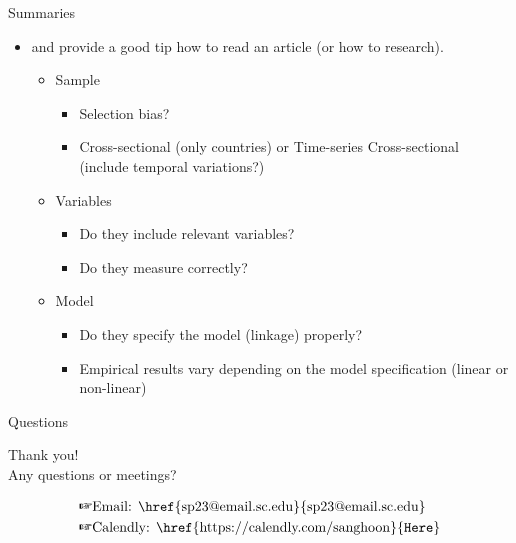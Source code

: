 \documentclass[xcolor=dvipsnames]{beamer}
\begin{document}
\begin{frame}[fragile]{Summaries}
	\begin{itemize}
    \item \citet{boix:stokes:2003} and \citet{wucherpfennig:Deutsch:2009} provide a good tip how to read an article (or how to research).
    \begin{itemize}
      \item Sample
        \begin{itemize}
          \item Selection bias?
          \item Cross-sectional (only countries) or Time-series Cross-sectional (include temporal variations?)
        \end{itemize}
      \item Variables
        \begin{itemize}
          \item Do they include relevant variables?
          \item Do they measure correctly?
        \end{itemize}
      \item Model
        \begin{itemize}
        \item Do they specify the model (linkage) properly?
        \item Empirical results vary depending on the model specification (linear or non-linear)
        \end{itemize}
    \end{itemize}
  \end{itemize}
\end{frame}


	\begin{frame}[fragile]{Questions}
		\begin{center}
			{\huge Thank you!}\\
			\bigskip		
			Any questions or meetings?\\
		\end{center}
		\begin{equation*}
			\begin{aligned}
				\text{\ding{43}}& \text{Email: \href{sp23@email.sc.edu}{sp23@email.sc.edu}}\\
				\text{\ding{43}}& \text{Calendly: \href{https://calendly.com/sanghoon}{\texttt{Here}}}
			\end{aligned}
		\end{equation*}
	\end{frame}
	
	\begin{frame}{}
		
		
	\end{frame}
\end{document}

